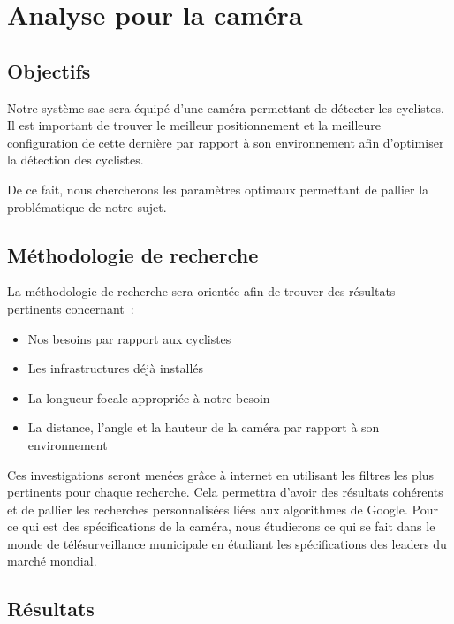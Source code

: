 
\section{Analyse pour la caméra}
\label{sec:camera}

\subsection{Objectifs}
\label{sec:camera_Objectifs}

Notre système \gls{sae} sera équipé d'une caméra permettant de détecter les cyclistes.
Il est important de trouver le meilleur positionnement et la meilleure configuration
de cette dernière par rapport à son environnement afin d'optimiser la détection des cyclistes.

De ce fait, nous chercherons les paramètres optimaux permettant de pallier la problématique de notre sujet.

\subsection{Méthodologie de recherche}
\label{sec:camera_Methodo}

La méthodologie de recherche sera orientée afin de trouver des résultats pertinents concernant :
\begin{itemize}
    \item Nos besoins par rapport aux cyclistes
    \item Les infrastructures déjà installés
    \item La longueur focale appropriée à notre besoin
    \item La distance, l'angle et la hauteur de la caméra par rapport à son environnement
\end{itemize}
Ces investigations seront menées grâce à internet en utilisant les filtres les plus pertinents pour chaque recherche.
Cela permettra d'avoir des résultats cohérents et de pallier les recherches personnalisées liées aux algorithmes de Google.
Pour ce qui est des spécifications de la caméra, nous étudierons ce qui se fait dans
le monde de télésurveillance municipale en étudiant les spécifications des leaders du marché mondial.

\subsection{Résultats}
\label{sec:camera_resultats}


